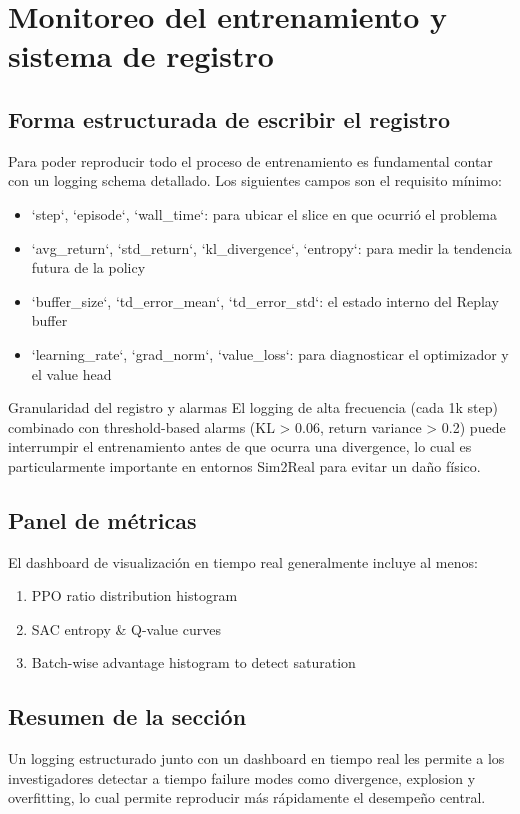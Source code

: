 \section{Monitoreo del entrenamiento y sistema de registro}

\subsection{Forma estructurada de escribir el registro}

Para poder reproducir todo el proceso de entrenamiento es fundamental contar con un logging schema detallado. Los siguientes campos son el requisito mínimo:

\begin{itemize}
    \item `step`, `episode`, `wall_time`: para ubicar el slice en que ocurrió el problema
    \item `avg_return`, `std_return`, `kl_divergence`, `entropy`: para medir la tendencia futura de la policy
    \item `buffer_size`, `td_error_mean`, `td_error_std`: el estado interno del Replay buffer
    \item `learning_rate`, `grad_norm`, `value_loss`: para diagnosticar el optimizador y el value head
\end{itemize}

\begin{importantbox}{Granularidad del registro y alarmas}
El logging de alta frecuencia (cada 1k step) combinado con threshold-based alarms (KL > 0.06, return variance > 0.2) puede interrumpir el entrenamiento antes de que ocurra una divergence, lo cual es particularmente importante en entornos Sim2Real para evitar un daño físico.
\end{importantbox}

\subsection{Panel de métricas}

El dashboard de visualización en tiempo real generalmente incluye al menos:

\begin{enumerate}
    \item PPO ratio distribution histogram
    \item SAC entropy \& Q-value curves
    \item Batch-wise advantage histogram to detect saturation
\end{enumerate}

\subsection{Resumen de la sección}

Un logging estructurado junto con un dashboard en tiempo real les permite a los investigadores detectar a tiempo failure modes como divergence, explosion y overfitting, lo cual permite reproducir más rápidamente el desempeño central.

